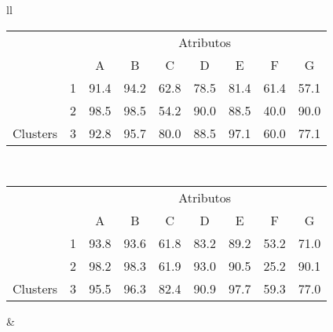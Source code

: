 \begin{table}[!h]
\begin{tabular}{ll}
   
   \small\addtolength{\tabcolsep}{-4pt}
   \begin{tabular}{|cl|c|c|c|c|c|c|c|}
        \hline \hline
                                 &   & \multicolumn{7}{c|}{Atributos}                                               \\ \cline{3-9} 
       \multicolumn{1}{|l}{}                            &   & A    & B & C & D & E & F & G \\ \hline
        \multicolumn{1}{|c|}{}                           & 1 &  91.4 & 94.2   & 62.8      & 78.5 & 81.4 & 61.4   & 57.1   \\ \cline{2-9} 
        \multicolumn{1}{|c|}{}                           & 2 & 98.5 & 98.5   & 54.2      & 90.0 & 88.5 & 40.0  & 90.0  \\ \cline{2-9} 
        \multicolumn{1}{|c|}{\multirow{-3}{*}{Clusters}} & 3 & 92.8 & 95.7   & 80.0      & 88.5 & 97.1 & 60.0  & 77.1  \\ \hline
      \end{tabular}
  \\  [8ex]
 
   \small\addtolength{\tabcolsep}{-4pt}
   \begin{tabular}{|cl|c|c|c|c|c|c|c|}
        \hline \hline
                                 &   & \multicolumn{7}{c|}{Atributos}                                               \\ \cline{3-9} 
       \multicolumn{1}{|l}{}                            &   & A    & B & C & D & E & F & G \\ \hline
        \multicolumn{1}{|c|}{}                           & 1 & 93.8 & 93.6   & 61.8      & 83.2 & 89.2 & 53.2   & 71.0   \\ \cline{2-9} 
        \multicolumn{1}{|c|}{}                           & 2 & 98.2 & 98.3   & 61.9      & 93.0 & 90.5 & 25.2  & 90.1  \\ \cline{2-9} 
        \multicolumn{1}{|c|}{\multirow{-3}{*}{Clusters}} & 3 & 95.5 & 96.3   & 82.4      & 90.9 & 97.7 & 59.3  & 77.0  \\ \hline
   \end{tabular}
    
    &
    

\end{tabular}
\end{table}
